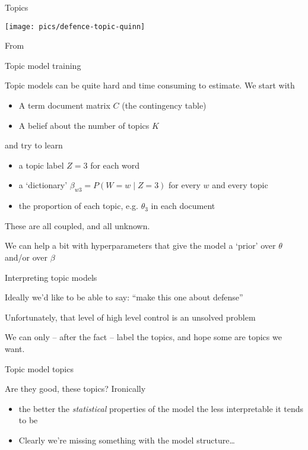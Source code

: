 \documentclass{hertieteaching}
\begin{document}
\begin{frame}{Topics}

\centerline{\texttt{[image: pics/defence-topic-quinn]}}

From \textcite{Quinn.etal2006}

\end{frame}

\begin{frame}{Topic model training}

Topic models can be quite hard and time consuming to estimate. We start with
\begin{itemize}
  \item A term document matrix $C$ (the contingency table)
  \item A belief about the number of topics $K$
\end{itemize}
and try to learn
\begin{itemize}
  \item a topic label $Z=3$ for each word
  \item a `dictionary' $\beta_{w3} = P(W=w \mid Z=3)$ for every $w$ and every topic
  \item the proportion of each topic, e.g. $\theta_3$ in each document
\end{itemize}
These are all coupled, and all unknown.

We can help a bit with hyperparameters that give the model a `prior' over $\theta$ and/or over $\beta$

\end{frame}

\begin{frame}{Interpreting topic models}

Ideally we'd like to be able to say: ``make this one about defense''

Unfortunately, that level of high level control is an unsolved problem

We can only -- after the fact -- label the topics, and hope some are topics we want.


\end{frame}
\begin{frame}{Topic model topics}

Are they good, these topics? Ironically
\begin{itemize}
  \item the better the \textit{statistical} properties of the model the less interpretable it tends to be \parencite{Chang.etal2009}
  \item Clearly we're missing something with the model structure\ldots
\end{itemize}

\end{frame}
\end{document}
